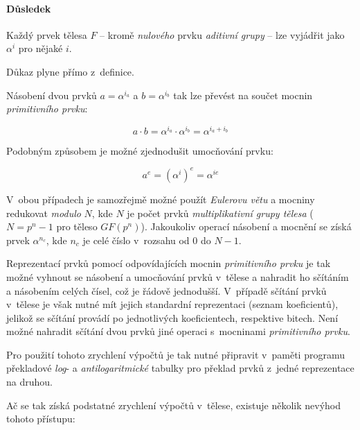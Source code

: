 \documentclass[thesis=M,czech,hidelinks]{FITthesis}[2012/06/26]
\newcommand{\0}{{\textcolor[gray]{0.80}{0}}}
\begin{document}
\paragraph{Důsledek} Každý prvek tělesa $F$ -- kromě \emph{nulového} prvku
\emph{aditivní grupy} -- lze vyjádřit jako $\alpha^i$ pro nějaké $i$.

Důkaz plyne přímo z~definice.

Násobení dvou prvků $a = \alpha^{i_a}$ a $b = \alpha^{i_b}$ tak lze převést na
součet mocnin \emph{primitivního prvku}:

$$ a \cdot b = \alpha^{i_a} \cdot \alpha^{i_b} = \alpha^{i_a + i_b} $$

Podobným způsobem je možné zjednodušit umocňování prvku:

$$ a^e = \left(\alpha^i\right)^e = \alpha^{i e} $$

V~obou případech je samozřejmě možné použít \emph{Eulerovu větu} a mocniny
redukovat \emph{modulo} $N$, kde $N$ je počet prvků \emph{multiplikativní grupy
tělesa} ($N=p^n-1$ pro těleso $GF(p^n)$). Jakoukoliv operací násobení a mocnění
se získá prvek $\alpha^{n_c}$, kde $n_c$ je celé číslo v~rozsahu od $0$ do
$N-1$.

Reprezentací prvků pomocí odpovídajících mocnin \emph{primitivního prvku} je tak
možné vyhnout se násobení a umocňování prvků v~tělese a nahradit ho sčítáním a
násobením celých čísel, což je řádově jednodušší. V~případě sčítání prvků
v~tělese je však nutné mít jejich standardní reprezentaci (seznam koeficientů),
jelikož se sčítání provádí po jednotlivých koeficientech, respektive bitech.
Není možné nahradit sčítání dvou prvků jiné operaci s~mocninami
\emph{primitivního prvku}.

Pro použití tohoto zrychlení výpočtů je tak nutné připravit v~paměti programu
překladové \emph{log}- a \emph{antilogaritmické} tabulky pro překlad prvků
z~jedné reprezentace na druhou.

\clearpage

Ač se tak získá podstatné zrychlení výpočtů v~tělese, existuje několik nevýhod
tohoto přístupu:
\end{document}
